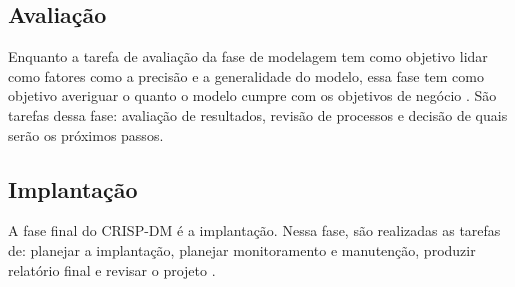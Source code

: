 \subsection{Avaliação} 
Enquanto a tarefa de avaliação da fase de modelagem tem como objetivo lidar como
fatores como a precisão e a generalidade do modelo, essa fase tem como objetivo
averiguar o quanto o modelo cumpre com os objetivos de negócio \cite{crispdm}. São
tarefas dessa fase: avaliação de resultados, revisão de processos e decisão de quais
serão os próximos passos. 

\subsection{Implantação} 
A fase final do CRISP-DM é a implantação. Nessa fase, são realizadas as tarefas de:
planejar a implantação, planejar monitoramento e manutenção, produzir relatório final
e revisar o projeto \cite{crispdm}.


